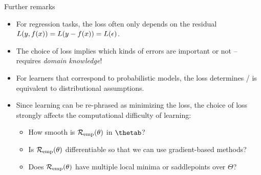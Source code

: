 \documentclass[11pt,compress,t,notes=noshow, xcolor=table]{beamer}
\begin{document}
\begin{vbframe}{Further remarks}

\begin{itemize}
\item For regression tasks, the loss often only depends on the residual $L(y, f(x)) = L(y - f(x)) = L(\epsilon)$.
\item The choice of loss implies which kinds of errors are important or not -- requires \emph{domain knowledge}!
\item For learners that correspond to probabilistic models, the loss determines / is equivalent to distributional assumptions.
\item Since learning can be re-phrased as minimizing the loss, the choice of loss strongly affects the computational difficulty of learning:
\begin{itemize}
    \item How smooth is $\mathcal{R}_{\text{emp}}(\theta)$ in $\thetab$?
    \item Is $\mathcal{R}_{\text{emp}}(\theta)$ differentiable so that we can use gradient-based methods?
    \item Does $\mathcal{R}_{\text{emp}}(\theta)$ have multiple local minima or saddlepoints over $\Theta$?\\
\end{itemize}

\end{itemize}
\end{vbframe}



\endlecture
\end{document}
